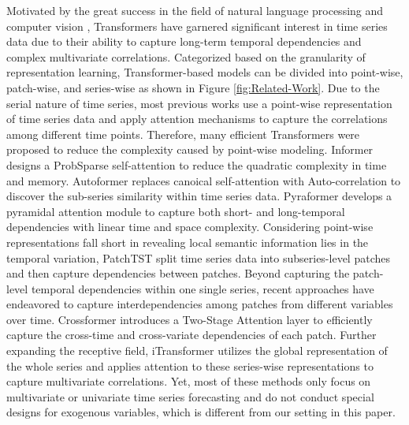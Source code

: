 \documentclass[nohyperref]{article}
\theoremstyle{plain}
\theoremstyle{definition}
\theoremstyle{remark}
\begin{document}
Motivated by the great success in the field of natural language processing \cite{devlin2018bert} and computer vision \cite{liu2021swin}, Transformers have garnered significant interest in time series data due to their ability to capture long-term temporal dependencies and complex multivariate correlations. Categorized based on the granularity of representation learning, Transformer-based models can be divided into point-wise, patch-wise, and series-wise as shown in Figure \ref{fig:Related-Work}. Due to the serial nature of time series, most previous works use a point-wise representation of time series data and apply attention mechanisms to capture the correlations among different time points. Therefore, many efficient Transformers \cite{zhou2021informer, wu2021autoformer, liu2021pyraformer, zhou2022fedformer} were proposed to reduce the complexity caused by point-wise modeling. Informer \cite{zhou2021informer} designs a ProbSparse self-attention to reduce the quadratic complexity in time and memory. Autoformer \cite{wu2021autoformer} replaces canoical self-attention with Auto-correlation to discover the sub-series similarity within time series data. Pyraformer \cite{liu2021pyraformer} develops a pyramidal attention module to capture both short- and long-temporal dependencies with linear time and space complexity. Considering point-wise representations fall short in revealing local semantic information lies in the temporal variation, PatchTST \cite{nie2022time} split time series data into subseries-level patches and then capture dependencies between patches.
Beyond capturing the patch-level temporal dependencies within one single series, recent approaches have endeavored to capture interdependencies among patches from different variables over time. Crossformer \cite{zhang2022crossformer} introduces a Two-Stage Attention layer to efficiently capture the cross-time and cross-variate dependencies of each patch. 
Further expanding the receptive field, iTransformer utilizes the global representation of the whole series and applies attention to these series-wise representations to capture multivariate correlations.
Yet, most of these methods only focus on multivariate or univariate time series forecasting and do not conduct special designs for exogenous variables, which is different from our setting in this paper.
\end{document}
